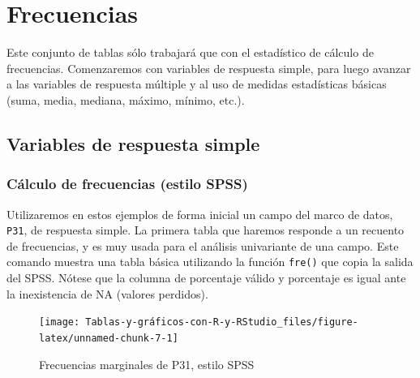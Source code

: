 \documentclass[
]{book}
\newenvironment{Shaded}{\begin{snugshade}}{\end{snugshade}}
\newcommand{\FunctionTok}[1]{\textcolor[rgb]{0.00,0.00,0.00}{#1}}
\newcommand{\NormalTok}[1]{#1}
\newcommand{\OtherTok}[1]{\textcolor[rgb]{0.56,0.35,0.01}{#1}}
\newcommand{\SpecialCharTok}[1]{\textcolor[rgb]{0.00,0.00,0.00}{#1}}
\begin{document}
\hypertarget{frecuencias}{%
\section{Frecuencias}\label{frecuencias}}

Este conjunto de tablas sólo trabajará que con el estadístico de cálculo de frecuencias. Comenzaremos con variables de respuesta simple, para luego avanzar a las variables de respuesta múltiple y al uso de medidas estadísticas básicas (suma, media, mediana, máximo, mínimo, etc.).

\hypertarget{variables-de-respuesta-simple}{%
\subsection{Variables de respuesta simple}\label{variables-de-respuesta-simple}}

\hypertarget{cuxe1lculo-de-frecuencias-estilo-spss}{%
\subsubsection{Cálculo de frecuencias (estilo SPSS)}\label{cuxe1lculo-de-frecuencias-estilo-spss}}

Utilizaremos en estos ejemplos de forma inicial un campo del marco de datos, \texttt{P31}, de respuesta simple. La primera tabla que haremos responde a un recuento de frecuencias, y es muy usada para el análisis univariante de una campo. Este comando muestra una tabla básica utilizando la función \texttt{fre()} que copia la salida del SPSS. Nótese que la columna de porcentaje válido y porcentaje es igual ante la inexistencia de NA (valores perdidos).

\begin{Shaded}
\end{Shaded}

\begin{figure}[H]

{\centering \texttt{[image: Tablas-y-gráficos-con-R-y-RStudio\_files/figure-latex/unnamed-chunk-7-1]} 

}

\caption{Frecuencias marginales de P31, estilo SPSS}\label{fig:unnamed-chunk-7}
\end{figure}
\end{document}
